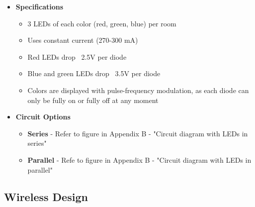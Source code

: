 \documentclass[12pt]{article}
\begin{document}
{				%
				{\renewcommand\labelitemi{}
					\begin{itemize}
						\item \textbf{Specifications}
						\begin{itemize}
							\item 3 LEDs of each color (red, green, blue) per room
							\item Uses constant current (270-300 mA)
							\item Red LEDs drop ~2.5V per diode
							\item Blue and green LEDs drop ~3.5V per diode
							\item Colors are displayed with pulse-frequency modulation, as each diode can only be fully on or fully off at any moment
						\end{itemize}
						\item \textbf{Circuit Options}
						\begin{itemize}
							\item \textbf{Series} - Refer to figure in Appendix B - "Circuit diagram with LEDs in series"
							\item \textbf{Parallel} - Refe to figure in Appendix B - "Circuit diagram with LEDs in parallel"
						\end{itemize}
					\end{itemize}
				
			\subsection{Wireless Design}
				
}}
\end{document}
